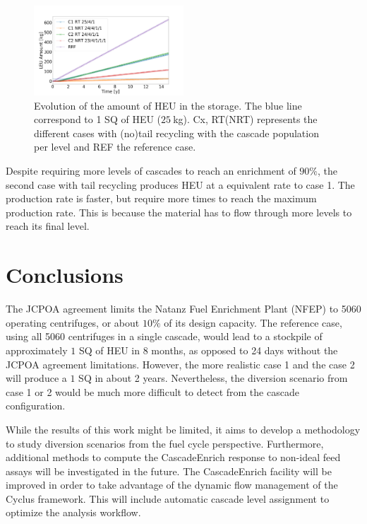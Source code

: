 \documentclass{anstrans}
\begin{document}
\begin{figure}[ht] %
  \centering
  \includegraphics[width=0.5\textwidth]{HEU_prod.png} \caption{Evolution of the
  amount of HEU in the storage. The blue line correspond to 1 SQ of HEU
  ($25~$kg). Cx, RT(NRT) represents the different cases with (no)tail recycling
  with the cascade population per level and REF the reference
  case.}\label{fig:heu_prod}
\end{figure}

Despite requiring more levels of cascades to reach an enrichment of $90\%$, the
second case with tail recycling produces HEU at a equivalent rate to case 1. The
production rate is faster, but require more times to reach the maximum
production rate. This is because the material has to flow through more levels to
reach its final level.


\section{Conclusions}

The JCPOA agreement limits the Natanz Fuel Enrichment Plant (NFEP) to 5060
operating centrifuges, or about $10\%$ of its design capacity. The reference
case, using all 5060 centrifuges in a single cascade, would lead to a stockpile
of approximately $1$ SQ of HEU in 8 months, as opposed to 24 days without the
JCPOA agreement limitations. However, the more realistic case 1 and the case 2
will produce a $1$ SQ in about 2 years. Nevertheless, the diversion scenario
from case 1 or 2 would be much more difficult to detect from the cascade
configuration.

While the results of this work might be limited, it aims to develop a
methodology to study diversion scenarios from the fuel cycle perspective.
Furthermore, additional methods to compute the CascadeEnrich response to
non-ideal feed assays will be investigated in the future.  The CascadeEnrich
facility will be improved in order to take advantage of the dynamic flow
management of the Cyclus framework. This will include automatic cascade level
assignment to optimize the analysis workflow.
\end{document}
